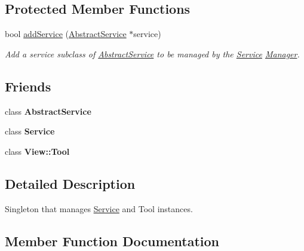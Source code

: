 \subsection*{Protected Member Functions}
\begin{DoxyCompactItemize}
\item 
bool \mbox{\hyperlink{classrev_1_1_service_manager_ab8c309682969b2cb25bf900f31505bb0}{add\+Service}} (\mbox{\hyperlink{classrev_1_1_abstract_service}{Abstract\+Service}} $\ast$service)
\begin{DoxyCompactList}\small\item\em Add a service subclass of \mbox{\hyperlink{classrev_1_1_abstract_service}{Abstract\+Service}} to be managed by the \mbox{\hyperlink{classrev_1_1_service}{Service}} \mbox{\hyperlink{classrev_1_1_manager}{Manager}}. \end{DoxyCompactList}\end{DoxyCompactItemize}
\subsection*{Friends}
\begin{DoxyCompactItemize}
\item 
\mbox{\label{classrev_1_1_service_manager_ae0d55af2e9eb676a521779bfea8c53e3}} 
class {\bfseries Abstract\+Service}
\item 
\mbox{\label{classrev_1_1_service_manager_a6474ceb8669761e879329b39c3afb899}} 
class {\bfseries Service}
\item 
\mbox{\label{classrev_1_1_service_manager_a0bfd88a9f0c9df0ad8791e2103f1ea94}} 
class {\bfseries View\+::\+Tool}
\end{DoxyCompactItemize}


\subsection{Detailed Description}
Singleton that manages \mbox{\hyperlink{classrev_1_1_service}{Service}} and Tool instances. 

\subsection{Member Function Documentation}
\mbox{\label{classrev_1_1_service_manager_af74579fd1a460c2caf521f9363f03ab1}} 
